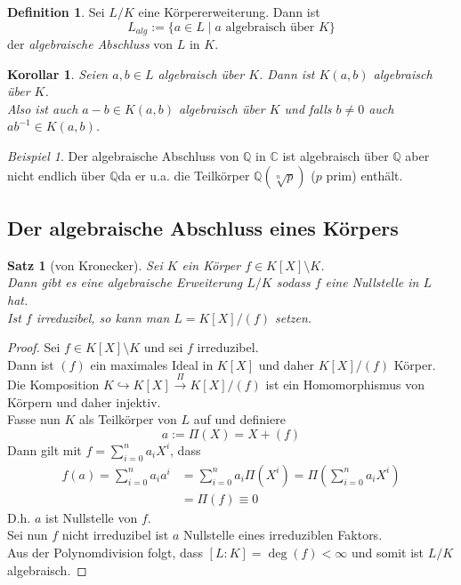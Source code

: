 \documentclass[10pt,a4paper]{article}
\newcommand{\Q}{\ensuremath{\mathbb{Q}}}
\newcommand{\C}{\ensuremath{\mathbb{C}}}
\theoremstyle{plain}
\newtheorem{kor}[theorem]{Korollar}
\newtheorem{satz}[theorem]{Satz}
\theoremstyle{definition}
\newtheorem{definition}[theorem]{Definition}
\theoremstyle{remark}
\newtheorem{exm}[theorem]{Beispiel}
\begin{document}
	\begin{definition}
		Sei $L/K$ eine Körpererweiterung. Dann ist
		\[L_{alg}:=\{a\in L\mid\text{$a$ algebraisch über $K$}\}\]
		der \emph{algebraische Abschluss} von $L$ in $K$.
	\end{definition}

	\begin{kor}
		Seien $a,b\in L$ algebraisch über $K$. Dann ist $K(a,b)$ algebraisch über $K$.\\
		Also ist auch $a-b\in K(a,b)$ algebraisch über $K$ und falls $b\neq0$ auch $ab^{-1}\in K(a,b)$.
	\end{kor}

	\begin{exm}
		Der algebraische Abschluss von $\Q$ in $\C$ ist algebraisch über $\Q$ aber nicht endlich über $\Q$da er u.a. die Teilkörper $\Q(\sqrt[n]{p})$ ($p$ prim) enthält.
	\end{exm}





	\subsection{Der algebraische Abschluss eines Körpers}
	
	\begin{satz}[von Kronecker]
		Sei $K$ ein Körper $f\in K[X]\setminus K$.\\
		Dann gibt es eine algebraische Erweiterung $L/K$ sodass $f$ eine Nullstelle in $L$ hat.\\
		Ist $f$ irreduzibel, so kann man $L=K[X]/(f)$ setzen.
	\end{satz}
	\begin{proof}
		Sei $f\in K[X]\setminus K$ und sei $f$ irreduzibel.\\
		Dann ist $(f)$ ein maximales Ideal in $K[X]$ und daher $K[X]/(f)$ Körper.\\
		Die Komposition $K\hookrightarrow K[X]\xrightarrow{\Pi} K[X]/(f)$ ist ein Homomorphismus von Körpern und daher injektiv.\\
		Fasse nun $K$ als Teilkörper von $L$ auf und definiere
		\[a:=\Pi(X)=X+(f)\]
		Dann gilt mit $f=\sum_{i=0}^{n}a_iX^i$, dass
		\begin{align*}
		f(a)=\sum_{i=0}^{n}a_ia^i&=\sum_{i=0}^{n}a_i\Pi(X^i)=\Pi\left(\sum_{i=0}^{n}a_iX^i\right)\\
		&=\Pi(f)\equiv 0
		\end{align*}
		D.h. $a$ ist Nullstelle von $f$.\\
		Sei nun $f$ nicht irreduzibel ist $a$ Nullstelle eines irreduziblen Faktors.\\
		Aus der Polynomdivision folgt, dass $[L:K]=\deg(f)<\infty$ und somit ist $L/K$ algebraisch.
	\end{proof}
\end{document}
